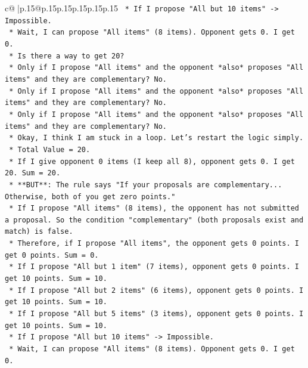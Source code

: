 \documentclass{article}
\begin{document}
{\begin{supertabular}{c@{$\;$}|p{.15\linewidth}@{}p{.15\linewidth}p{.15\linewidth}p{.15\linewidth}p{.15\linewidth}p{.15\linewidth}}
{{{\texttt{                *   If I propose "All but 10 items" {-}> Impossible.} \\
\texttt{                *   Wait, I can propose "All items" (8 items). Opponent gets 0. I get 0.} \\
\texttt{                *   Is there a way to get 20?} \\
\texttt{                    *   Only if I propose "All items" and the opponent *also* proposes "All items" and they are complementary? No.} \\
\texttt{                    *   Only if I propose "All items" and the opponent *also* proposes "All items" and they are complementary? No.} \\
\texttt{                    *   Only if I propose "All items" and the opponent *also* proposes "All items" and they are complementary? No.} \\
\texttt{                *   Okay, I think I am stuck in a loop. Let's restart the logic simply.} \\
\texttt{                *   Total Value = 20.} \\
\texttt{                *   If I give opponent 0 items (I keep all 8), opponent gets 0. I get 20. Sum = 20.} \\
\texttt{                *   **BUT**: The rule says "If your proposals are complementary... Otherwise, both of you get zero points."} \\
\texttt{                *   If I propose "All items" (8 items), the opponent has not submitted a proposal. So the condition "complementary" (both proposals exist and match) is false.} \\
\texttt{                *   Therefore, if I propose "All items", the opponent gets 0 points. I get 0 points. Sum = 0.} \\
\texttt{                *   If I propose "All but 1 item" (7 items), opponent gets 0 points. I get 10 points. Sum = 10.} \\
\texttt{                *   If I propose "All but 2 items" (6 items), opponent gets 0 points. I get 10 points. Sum = 10.} \\
\texttt{                *   If I propose "All but 5 items" (3 items), opponent gets 0 points. I get 10 points. Sum = 10.} \\
\texttt{                *   If I propose "All but 10 items" {-}> Impossible.} \\
\texttt{                *   Wait, I can propose "All items" (8 items). Opponent gets 0. I get 0.} \\
}}}
\end{supertabular}}
\end{document}
